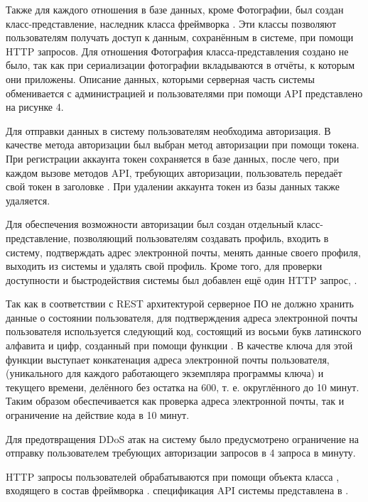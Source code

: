 \tab
Также для каждого отношения в базе данных, кроме Фотографии, был создан класс-представление, наследник класса  фреймворка .
Эти классы позволяют пользователям получать доступ к данным, сохранённым в системе, при помощи HTTP запросов.
Для отношения Фотография класса-представления создано не было, так как при сериализации фотографии вкладываются в отчёты, к которым они приложены.
Описание данных, которыми серверная часть системы обменивается с администрацией и пользователями при помощи API представлено на рисунке 4.
\picturefour

\tab
Для отправки данных в систему пользователям необходима авторизация. В качестве метода авторизации был выбран метод авторизации при помощи токена. При регистрации аккаунта токен сохраняется в базе данных, после чего, при каждом вызове методов API, требующих авторизации, пользователь передаёт свой токен в заголовке . При удалении аккаунта токен из базы данных также удаляется.

\tab
Для обеспечения возможности авторизации был создан отдельный класс-представление, позволяющий пользователям создавать профиль, входить в систему, подтверждать адрес электронной почты, менять данные своего профиля, выходить из системы и удалять свой профиль.
Кроме того, для проверки доступности и быстродействия системы был добавлен ещё один HTTP запрос, .

\tab
Так как в соответствии с REST архитектурой серверное ПО не должно хранить данные о состоянии пользователя, для подтверждения адреса электронной почты пользователя используется следующий код, состоящий из восьми букв латинского алфавита и цифр, созданный при помощи функции .
В качестве ключа для этой функции выступает конкатенация адреса электронной почты пользователя,  (уникального для каждого работающего экземпляра программы ключа) и  текущего времени, делённого без остатка на 600, т. е. округлённого до 10 минут.
Таким образом обеспечивается как проверка адреса электронной почты, так и ограничение на действие кода в 10 минут.

\tab
Для предотвращения DDoS атак на систему было предусмотрено ограничение на отправку пользователем требующих авторизации запросов в 4 запроса в минуту.

\tab
HTTP запросы пользователей обрабатываются при помощи объекта класса , входящего в состав фреймворка .  спецификация API системы представлена в .

